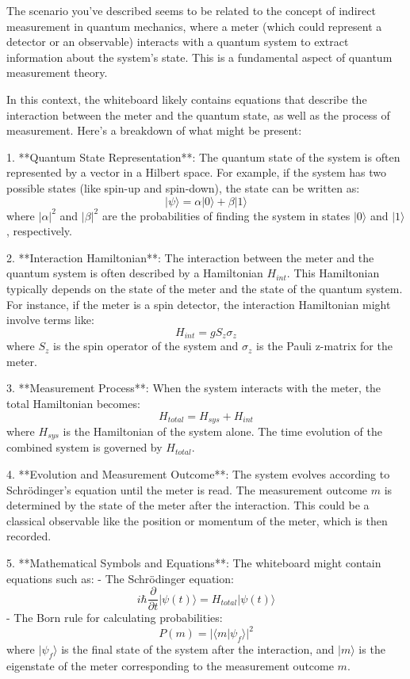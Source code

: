 The scenario you've described seems to be related to the concept of indirect measurement in quantum mechanics, where a meter (which could represent a detector or an observable) interacts with a quantum system to extract information about the system's state. This is a fundamental aspect of quantum measurement theory.

In this context, the whiteboard likely contains equations that describe the interaction between the meter and the quantum state, as well as the process of measurement. Here’s a breakdown of what might be present:

1. **Quantum State Representation**: The quantum state of the system is often represented by a vector in a Hilbert space. For example, if the system has two possible states (like spin-up and spin-down), the state can be written as:
   \[
   |\psi\rangle = \alpha |0\rangle + \beta |1\rangle
   \]
   where \(|\alpha|^2\) and \(|\beta|^2\) are the probabilities of finding the system in states \(|0\rangle\) and \(|1\rangle\), respectively.

2. **Interaction Hamiltonian**: The interaction between the meter and the quantum system is often described by a Hamiltonian \(H_{int}\). This Hamiltonian typically depends on the state of the meter and the state of the quantum system. For instance, if the meter is a spin detector, the interaction Hamiltonian might involve terms like:
   \[
   H_{int} = g S_z \sigma_z
   \]
   where \(S_z\) is the spin operator of the system and \(\sigma_z\) is the Pauli z-matrix for the meter.

3. **Measurement Process**: When the system interacts with the meter, the total Hamiltonian becomes:
   \[
   H_{total} = H_{sys} + H_{int}
   \]
   where \(H_{sys}\) is the Hamiltonian of the system alone. The time evolution of the combined system is governed by \(H_{total}\).

4. **Evolution and Measurement Outcome**: The system evolves according to Schrödinger's equation until the meter is read. The measurement outcome \(m\) is determined by the state of the meter after the interaction. This could be a classical observable like the position or momentum of the meter, which is then recorded.

5. **Mathematical Symbols and Equations**: The whiteboard might contain equations such as:
   - The Schrödinger equation: 
     \[
     i\hbar \frac{\partial}{\partial t} |\psi(t)\rangle = H_{total} |\psi(t)\rangle
     \]
   - The Born rule for calculating probabilities:
     \[
     P(m) = |\langle m | \psi_f \rangle|^2
     \]
     where \(|\psi_f\rangle\) is the final state of the system after the interaction, and \(|m\rangle\) is the eigenstate of the meter corresponding to the measurement outcome \(m\).

